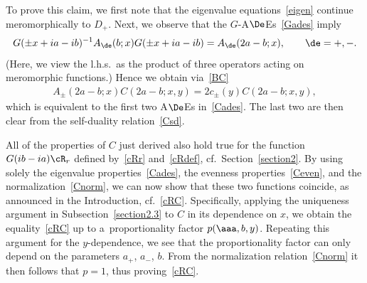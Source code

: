  To prove this claim, we f\/irst note that the eigenvalue equations~\eqref{eigen} continue meromorphically to $D_+$. Next, we observe that the $G$-A$\De$Es~\eqref{Gades} imply
\begin{gather}
G(\pm x +ia-ib)^{-1}A_{\de}(b;x)G(\pm x +ia-ib)=A_{\de}(2a-b;x),\qquad \de=+,-.
\end{gather}
(Here, we view the l.h.s.\ as the product of three operators acting on meromorphic functions.)
Hence we obtain via~\eqref{BC}
\begin{gather}
A_{\pm}(2a-b;x)C(2a-b;x,y)=2c_{\pm}(y)C(2a-b;x,y),
\end{gather}
which is equivalent to the f\/irst two A$\De$Es in~\eqref{Cades}. The last two are then clear from the self-duality relation~\eqref{Csd}.

All of the properties of $C$ just derived also hold true for the function $G(ib-ia)\cR_r$ def\/ined by~\eqref{cRr} and~\eqref{cRdef}, cf.~Section~\ref{section2}. By using solely the eigenvalue properties~\eqref{Cades}, the evenness properties~\eqref{Ceven}, and the normalization~\eqref{Cnorm}, we can now show that these two functions coincide, as announced in the Introduction, cf.~\eqref{cRC}. Specif\/ically, applying the uniqueness argument in Subsection~\ref{section2.3} to $C$ in its dependence on $x$, we obtain the equality~\eqref{cRC} up to a~proportionality factor $p(\aaa,b,y)$. Repeating this argument for the $y$-dependence, we see that the proportionality factor can only depend on the parameters $a_+$, $a_-$, $b$. From the normalization relation~\eqref{Cnorm} it then follows that $p=1$, thus proving~\eqref{cRC}.

